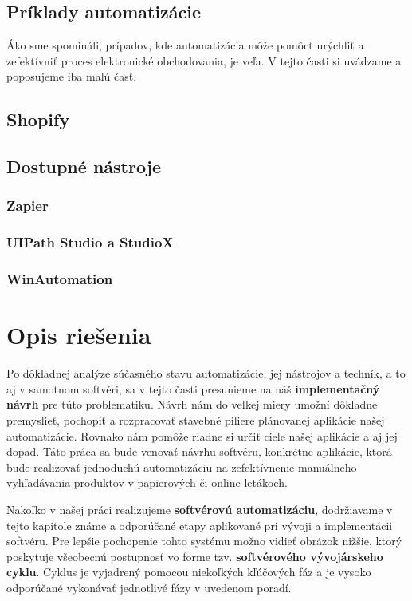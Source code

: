 \documentclass[twoside,slovak, a4paper]{article}
\begin{document}
\subsection{Príklady automatizácie}

Áko sme spomináli, prípadov, kde automatizácia môže pomôcť urýchliť a zefektívniť proces elektronické obchodovania, je veľa. V tejto časti si uvádzame a poposujeme iba malú časť.



\subsection{Shopify}
\subsection{Dostupné nástroje}

\subsubsection{Zapier}

\subsubsection{UIPath Studio a StudioX}

\subsubsection{WinAutomation}

\newpage

\section{Opis riešenia}

Po dôkladnej analýze súčasného stavu automatizácie, jej nástrojov a techník, a to aj v samotnom softvéri, sa v tejto časti presunieme na náš \textbf{implementačný návrh} pre túto problematiku. Návrh nám do veľkej miery umožní dôkladne premyslieť, pochopiť a rozpracovať stavebné piliere plánovanej aplikácie našej automatizácie. Rovnako nám pomôže riadne si určiť ciele našej aplikácie a aj jej dopad. Táto práca sa bude venovať návrhu softvéru, konkrétne aplikácie, ktorá bude realizovať jednoduchú automatizáciu na zefektívnenie manuálneho vyhľadávania produktov v papierových či online letákoch.

Nakoľko v našej práci realizujeme \textbf{softvérovú automatizáciu}, dodržiavame v tejto kapitole známe a odporúčané etapy aplikované pri vývoji a implementácii softvéru. Pre lepšie pochopenie tohto systému možno vidieť obrázok nižšie, ktorý poskytuje všeobecnú postupnosť vo forme tzv. \textbf{softvérového vývojárskeho cyklu}. Cyklus je vyjadrený pomocou niekoľkých kľúčových fáz a je vysoko odporúčané vykonávať jednotlivé fázy v uvedenom poradí.
\end{document}
